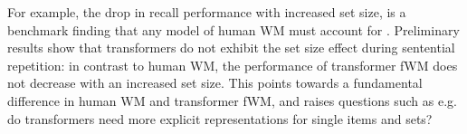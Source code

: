 For example, the drop in recall performance with increased set size, is a benchmark finding that any model of human WM must account for \parencite{oberauer_benchmarks_2018}. Preliminary results show that transformers do not exhibit the set size effect during sentential repetition: in contrast to human WM, the performance of transformer fWM does not decrease with an increased set size.
This points towards a fundamental difference in human WM and transformer fWM, and raises questions such as e.g. do transformers need more explicit representations for single items and sets?

\newpage

